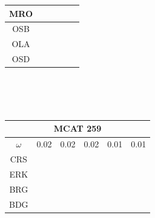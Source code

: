 \documentclass[12pt]{article}
\begin{document}
\begin{landscape}
\begin{figure}
\begin{minipage}[c]{0.3\textwidth}
\begin{tabular}{|c|c|c|c|c|c|}
        MRO&\cellcolor[HTML]{4DAF4A}&\cellcolor[HTML]{4DAF4A}&\cellcolor[HTML]{4DAF4A}&\cellcolor[HTML]{984EA3}&\cellcolor[HTML]{984EA3}\\ \hline %
        OSB&\cellcolor[HTML]{4DAF4A}&\cellcolor[HTML]{4DAF4A}&\cellcolor[HTML]{4DAF4A}&\cellcolor[HTML]{984EA3}&\cellcolor[HTML]{984EA3}\\ \hline %
        OLA&\cellcolor[HTML]{984EA3}&\cellcolor[HTML]{984EA3}&\cellcolor[HTML]{984EA3}&\cellcolor[HTML]{FF7F00}&\cellcolor[HTML]{FF7F00}\\ \hline %
        OSD&\cellcolor[HTML]{FF7F00}&\cellcolor[HTML]{984EA3}&\cellcolor[HTML]{984EA3}&\cellcolor[HTML]{FF7F00}&\cellcolor[HTML]{FF7F00}\\ \hline %
\end{tabular}\\$~$\\$~$\\
\hspace*{-5cm}
\begin{tabular}{|c|c|c|c|c|c|}%
         \hline \multicolumn{6}{|c|}{MCAT 259} \\ \hline
         $\omega$&0.02&0.02&0.02&0.01&0.01\\ \hline %
        CRS&\cellcolor[HTML]{E41A1C}&\cellcolor[HTML]{E41A1C}&\cellcolor[HTML]{E41A1C}&\cellcolor[HTML]{E41A1C}&\cellcolor[HTML]{E41A1C}\\ \hline %
        ERK&\cellcolor[HTML]{E41A1C}&\cellcolor[HTML]{E41A1C}&\cellcolor[HTML]{377EB8}&\cellcolor[HTML]{377EB8}&\cellcolor[HTML]{377EB8}\\ \hline %
        BRG&\cellcolor[HTML]{377EB8}&\cellcolor[HTML]{377EB8}&\cellcolor[HTML]{4DAF4A}&\cellcolor[HTML]{377EB8}&\cellcolor[HTML]{377EB8}\\ \hline %
        BDG&\cellcolor[HTML]{377EB8}&\cellcolor[HTML]{377EB8}&\cellcolor[HTML]{4DAF4A}&\cellcolor[HTML]{4DAF4A}&\cellcolor[HTML]{4DAF4A}\\ \hline %

\end{tabular}
\end{minipage}
\end{figure}
\end{landscape}
\end{document}
